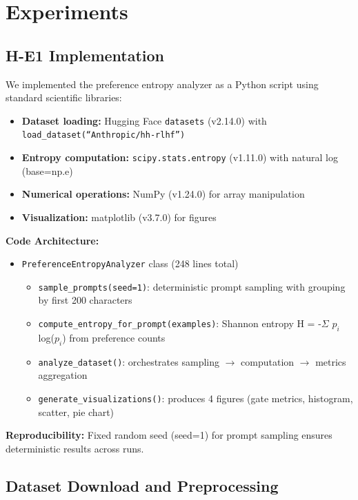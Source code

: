\section{Experiments}

\subsection{H-E1 Implementation}

We implemented the preference entropy analyzer as a Python script using standard scientific libraries:

\begin{itemize}
\item \textbf{Dataset loading:} Hugging Face \texttt{datasets} (v2.14.0) with \texttt{load\_dataset(``Anthropic/hh-rlhf'')}
\item \textbf{Entropy computation:} \texttt{scipy.stats.entropy} (v1.11.0) with natural log (base=np.e)
\item \textbf{Numerical operations:} NumPy (v1.24.0) for array manipulation
\item \textbf{Visualization:} matplotlib (v3.7.0) for figures
\end{itemize}

\textbf{Code Architecture:}
\begin{itemize}
\item \texttt{PreferenceEntropyAnalyzer} class (248 lines total)
  \begin{itemize}
  \item \texttt{sample\_prompts(seed=1)}: deterministic prompt sampling with grouping by first 200 characters
  \item \texttt{compute\_entropy\_for\_prompt(examples)}: Shannon entropy H = -$\Sigma$ $p_i$ log($p_i$) from preference counts
  \item \texttt{analyze\_dataset()}: orchestrates sampling $\rightarrow$ computation $\rightarrow$ metrics aggregation
  \item \texttt{generate\_visualizations()}: produces 4 figures (gate metrics, histogram, scatter, pie chart)
  \end{itemize}
\end{itemize}

\textbf{Reproducibility:} Fixed random seed (seed=1) for prompt sampling ensures deterministic results across runs.

\subsection{Dataset Download and Preprocessing}

